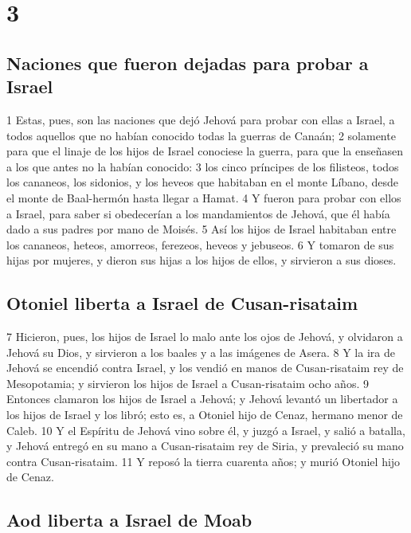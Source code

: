 \chapter{3}

\section*{Naciones que fueron dejadas para probar a Israel}


1 Estas, pues, son las naciones que dejó Jehová para probar con ellas a Israel, a todos aquellos que no habían conocido todas la guerras de Canaán;
2 solamente para que el linaje de los hijos de Israel conociese la guerra, para que la enseñasen a los que antes no la habían conocido:
3 los cinco príncipes de los filisteos, todos los cananeos, los sidonios, y los heveos que habitaban en el monte Líbano, desde el monte de Baal-hermón hasta llegar a Hamat.
4 Y fueron para probar con ellos a Israel, para saber si obedecerían a los mandamientos de Jehová, que él había dado a sus padres por mano de Moisés.
5 Así los hijos de Israel habitaban entre los cananeos, heteos, amorreos, ferezeos, heveos y jebuseos.
6 Y tomaron de sus hijas por mujeres, y dieron sus hijas a los hijos de ellos, y sirvieron a sus dioses.
\section*{Otoniel liberta a Israel de Cusan-risataim}

7 Hicieron, pues, los hijos de Israel lo malo ante los ojos de Jehová, y olvidaron a Jehová su Dios, y sirvieron a los baales y a las imágenes de Asera.
8 Y la ira de Jehová se encendió contra Israel, y los vendió en manos de Cusan-risataim rey de Mesopotamia; y sirvieron los hijos de Israel a Cusan-risataim ocho años.
9 Entonces clamaron los hijos de Israel a Jehová; y Jehová levantó un libertador a los hijos de Israel y los libró; esto es, a Otoniel hijo de Cenaz, hermano menor de Caleb.
10 Y el Espíritu de Jehová vino sobre él, y juzgó a Israel, y salió a batalla, y Jehová entregó en su mano a Cusan-risataim rey de Siria, y prevaleció su mano contra Cusan-risataim.
11 Y reposó la tierra cuarenta años; y murió Otoniel hijo de Cenaz.
\section*{Aod liberta a Israel de Moab}


